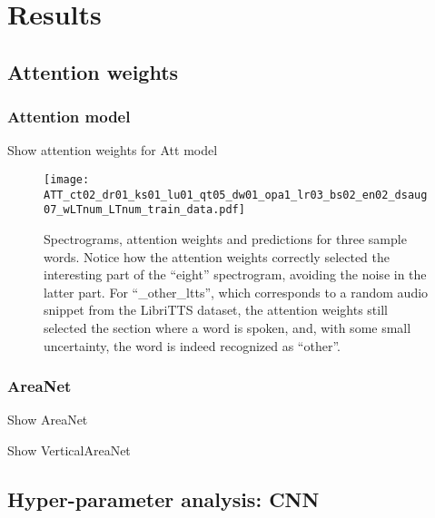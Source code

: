
\section{Results}
\label{sec:results}

\subsection{Attention weights}

\subsubsection{Attention model}

Show attention weights for Att model

\begin{figure*}[t!]
    \centering
    \texttt{[image: ATT\_ct02\_dr01\_ks01\_lu01\_qt05\_dw01\_opa1\_lr03\_bs02\_en02\_dsaug07\_wLTnum\_LTnum\_train\_data.pdf]}
    \caption{Spectrograms, attention weights and predictions for three sample words.
    Notice how the attention weights correctly selected the interesting part of
    the ``eight'' spectrogram, avoiding the noise in the latter part.
    For ``\_other\_ltts'', which corresponds to a random audio snippet from the LibriTTS
    dataset, the attention weights still selected the section where a word is spoken,
    and, with some small uncertainty, the word is indeed recognized as ``other''.}%
    \label{fig:attention_weights_standard}
\end{figure*}

\subsubsection{AreaNet}

Show AreaNet

Show VerticalAreaNet

\subsection{Hyper-parameter analysis: CNN}


